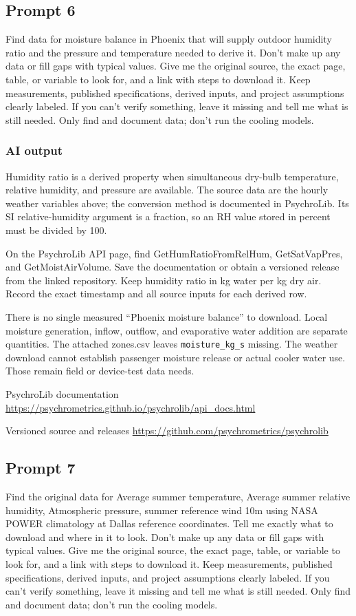 \subsection*{Prompt 6}
Find data for moisture balance in Phoenix that will supply outdoor humidity ratio and the pressure and temperature needed to derive it. Don’t make up any data or fill gaps with typical values. Give me the original source, the exact page, table, or variable to look for, and a link with steps to download it. Keep measurements, published specifications, derived inputs, and project assumptions clearly labeled. If you can’t verify something, leave it missing and tell me what is still needed. Only find and document data; don’t run the cooling models.

\subsubsection*{AI output}
Humidity ratio is a derived property when simultaneous dry-bulb temperature, relative humidity, and pressure are available. The source data are the hourly weather variables above; the conversion method is documented in PsychroLib. Its SI relative-humidity argument is a fraction, so an RH value stored in percent must be divided by 100.

On the PsychroLib API page, find GetHumRatioFromRelHum, GetSatVapPres, and GetMoistAirVolume. Save the documentation or obtain a versioned release from the linked repository. Keep humidity ratio in kg water per kg dry air. Record the exact timestamp and all source inputs for each derived row.

There is no single measured “Phoenix moisture balance” to download. Local moisture generation, inflow, outflow, and evaporative water addition are separate quantities. The attached zones.csv leaves \nolinkurl{moisture_kg_s} missing. The weather download cannot establish passenger moisture release or actual cooler water use. Those remain field or device-test data needs.

PsychroLib documentation  \url{https://psychrometrics.github.io/psychrolib/api_docs.html}

Versioned source and releases  \url{https://github.com/psychrometrics/psychrolib}

\subsection*{Prompt 7}
Find the original data for Average summer temperature, Average summer relative humidity, Atmospheric pressure, summer reference wind 10m using NASA POWER climatology at Dallas reference coordinates. Tell me exactly what to download and where in it to look. Don’t make up any data or fill gaps with typical values. Give me the original source, the exact page, table, or variable to look for, and a link with steps to download it. Keep measurements, published specifications, derived inputs, and project assumptions clearly labeled. If you can’t verify something, leave it missing and tell me what is still needed. Only find and document data; don’t run the cooling models.

